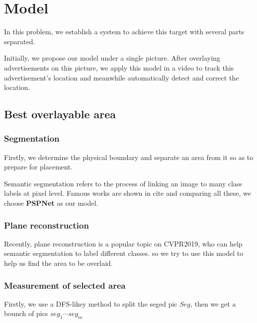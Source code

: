 \documentclass{sig-alternate}
\begin{document}
\section{Model}
\label{sec:model}

In this problem, we establish a system to achieve this target with several parts separated. 

Initially, we propose our model under a single picture. 
After overlaying advertisements on this picture, we apply this model in a video to track this advertisement's location and  meanwhile automatically detect and correct the location.

\subsection{Best overlayable area}

\subsubsection{Segmentation}
Firstly, we determine the physical boundary and separate an area from it so as to prepare for placement.

Semantic segmentation refers to the process of linking an image to many class labels at pixel level. Famous works are shown in cite \cie{} and comparing all these, we choose \textbf{PSPNet} as our model.


\subsubsection{Plane reconstruction}

Recently, plane reconstruction is a popular topic on CVPR2019, who can help semantic segmentation to label different classes. so we try to use this model to help us find the area to be overlaid.

\subsubsection{Measurement of selected area}

Firstly, we use a DFS-likey method to split the seged pic $Seg$, then we get a bounch of pics $seg_1 \cdots seg_m$

\end{document}
